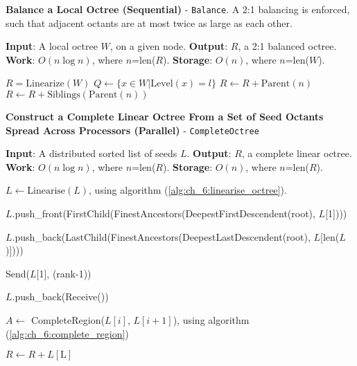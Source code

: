 \begin{algorithm}
    \caption{\textbf{Balance a Local Octree (Sequential)} - \texttt{Balance}. A 2:1 balancing is enforced, such that adjacent octants are at most twice as large as each other.}
    \label{alg:ch_6:balance_octree}
    \begin{algorithmic}
        \STATE \textbf{Input}: A local octree $W$, on a given node.
        \STATE \textbf{Output}: $R$, a 2:1 balanced octree. 
        \STATE \textbf{Work}: $O(n \log n)$, where $n$=len($R$).
        \STATE \textbf{Storage}: $O(n)$, where $n$=len($W$).

        \STATE $R = \text{Linearize}(W)$
            \STATE $Q \gets \{ x \in W | \text{Level}(x) = l \}$
                        \STATE $R \gets R + \text{Parent}(n)$
                        \STATE $R \gets R + \text{Siblings}(\text{Parent}(n))$
                    \ENDIF
                \ENDFOR
            \ENDFOR
        \ENDFOR
    \end{algorithmic}
\end{algorithm}

\begin{algorithm}
    \caption{\textbf{Construct a Complete Linear Octree From a Set of Seed Octants Spread Across Processors (Parallel)} - \texttt{CompleteOctree}}
    \label{alg:ch_6:complete_octree}
    \begin{algorithmic}
        \STATE \textbf{Input}: A distributed sorted list of seeds $L$.
        \STATE \textbf{Output}: $R$, a complete linear octree. 
        \STATE \textbf{Work}: $O(n \log n)$, where $n$=len($R$).
        \STATE \textbf{Storage}: $O(n)$, where $n$=len($R$).

        \STATE $L \gets \text{Linearise}(L)$, using algorithm (\ref{alg:ch_6:linearise_octree}).

            \STATE $L$.push\_front(FirstChild(FinestAncestors(DeepestFirstDescendent(root), $L$[1])))
        \ENDIF
        
            \STATE $L$.push\_back(LastChild(FinestAncestors(DeepestLastDescendent(root), $L$[len($L$)])))
        \ENDIF

            \STATE Send($L$[1], (rank-1))
        \ENDIF

            \STATE $L$.push\_back(Receive())
        \ENDIF

            \STATE $A \gets$ CompleteRegion($L[i]$, $L[i+1]$), using algorithm (\ref{alg:ch_6:complete_region})
        \ENDFOR
        
            \STATE $R \gets R+L[\text{L}]$
        \ENDIF

    \end{algorithmic}
\end{algorithm}

